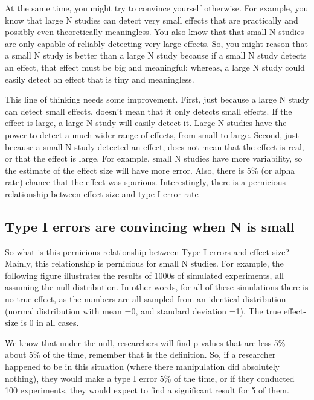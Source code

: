 \documentclass[
  letterpaper,
  DIV=11,
  numbers=noendperiod]{scrreprt}
\begin{document}
At the same time, you might try to convince yourself otherwise. For
example, you know that large N studies can detect very small effects
that are practically and possibly even theoretically meaningless. You
also know that that small N studies are only capable of reliably
detecting very large effects. So, you might reason that a small N study
is better than a large N study because if a small N study detects an
effect, that effect must be big and meaningful; whereas, a large N study
could easily detect an effect that is tiny and meaningless.

This line of thinking needs some improvement. First, just because a
large N study can detect small effects, doesn't mean that it only
detects small effects. If the effect is large, a large N study will
easily detect it. Large N studies have the power to detect a much wider
range of effects, from small to large. Second, just because a small N
study detected an effect, does not mean that the effect is real, or that
the effect is large. For example, small N studies have more variability,
so the estimate of the effect size will have more error. Also, there is
5\% (or alpha rate) chance that the effect was spurious. Interestingly,
there is a pernicious relationship between effect-size and type I error
rate

\subsection{Type I errors are convincing when N is
small}\label{type-i-errors-are-convincing-when-n-is-small}

So what is this pernicious relationship between Type I errors and
effect-size? Mainly, this relationship is pernicious for small N
studies. For example, the following figure illustrates the results of
1000s of simulated experiments, all assuming the null distribution. In
other words, for all of these simulations there is no true effect, as
the numbers are all sampled from an identical distribution (normal
distribution with mean =0, and standard deviation =1). The true
effect-size is 0 in all cases.

We know that under the null, researchers will find p values that are
less 5\% about 5\% of the time, remember that is the definition. So, if
a researcher happened to be in this situation (where there manipulation
did absolutely nothing), they would make a type I error 5\% of the time,
or if they conducted 100 experiments, they would expect to find a
significant result for 5 of them.
\end{document}
